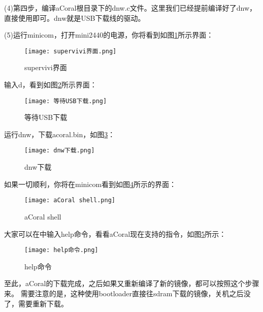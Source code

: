 (4)第四步，编译aCoral根目录下的dnw.c文件。这里我们已经提前编译好了dnw，直接使用即可。dnw就是USB下载线的驱动。

(5)运行minicom，打开mini2440的电源，你将看到如图\ref{supervivi界面}所示界面：
\begin{figure}[H]
	\texttt{[image: supervivi界面.png]}
	\caption{supervivi界面}
	\label{supervivi界面}
\end{figure}

输入d，看到如图\ref{等待USB下载}所示界面：
\begin{figure}[H]
	\texttt{[image: 等待USB下载.png]}
	\caption{等待USB下载}
	\label{等待USB下载}
\end{figure}

运行dnw，下载acoral.bin，如图\ref{dnw下载}：
\begin{figure}[H]
	\texttt{[image: dnw下载.png]}
	\caption{dnw下载}
	\label{dnw下载}
\end{figure}

如果一切顺利，你将在minicom看到如图\ref{aCoral shell}所示的界面：
\begin{figure}[H]
	\texttt{[image: aCoral shell.png]}
	\caption{aCoral shell}
	\label{aCoral shell}
\end{figure}

大家可以在中输入help命令，看看aCoral现在支持的指令，如图\ref{help命令}所示：
\begin{figure}[H]
	\texttt{[image: help命令.png]}
	\caption{help命令}
	\label{help命令}
\end{figure}

至此，aCoral的下载完成，之后如果又重新编译了新的镜像，都可以按照这个步骤来。
需要注意的是，这种使用bootloader直接往sdram下载的镜像，关机之后没了，需要重新下载。